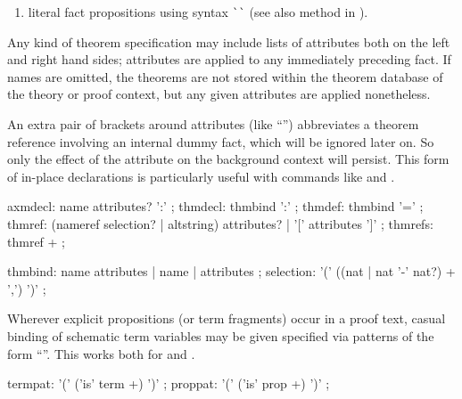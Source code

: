 \begin{isabellebody}
\begin{isamarkuptext}
\begin{enumerate}
  \item literal fact propositions using  syntax
  \verb|`|\isa{{\isasymphi}}\verb|`| (see also method
   in ).

  \end{enumerate}

  Any kind of theorem specification may include lists of attributes
  both on the left and right hand sides; attributes are applied to any
  immediately preceding fact.  If names are omitted, the theorems are
  not stored within the theorem database of the theory or proof
  context, but any given attributes are applied nonetheless.

  An extra pair of brackets around attributes (like ``'') abbreviates a theorem reference involving an
  internal dummy fact, which will be ignored later on.  So only the
  effect of the attribute on the background context will persist.
  This form of in-place declarations is particularly useful with
  commands like  and .

  \begin{rail}
    axmdecl: name attributes? ':'
    ;
    thmdecl: thmbind ':'
    ;
    thmdef: thmbind '='
    ;
    thmref: (nameref selection? | altstring) attributes? | '[' attributes ']'
    ;
    thmrefs: thmref +
    ;

    thmbind: name attributes | name | attributes
    ;
    selection: '(' ((nat | nat '-' nat?) + ',') ')'
    ;
  \end{rail}%
\end{isamarkuptext}%
\isamarkuptrue%
%
\isamarkuptrue%
%
\begin{isamarkuptext}%
Wherever explicit propositions (or term fragments) occur in a proof
  text, casual binding of schematic term variables may be given
  specified via patterns of the form ``''.  This works both for  and .

  \begin{rail}
    termpat: '(' ('is' term +) ')'
    ;
    proppat: '(' ('is' prop +) ')'
    ;
  \end{rail}


\end{isamarkuptext}
\end{isabellebody}
